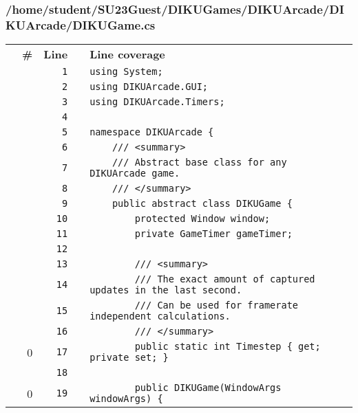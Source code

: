 \documentclass[a4paper,landscape,10pt]{article}
\begin{document}
\subsubsection{/home/student/SU23Guest/DIKUGames/DIKUArcade/DIKUArcade/DIKUGame.cs}
\begin{longtable}[l]{lrrll}
\textbf{} & \textbf{\#} & \textbf{Line} & \textbf{} & \textbf{Line coverage}\\
\cellcolor{gray} &  & \verb~1~ & & \verb~using System;~\\
\cellcolor{gray} &  & \verb~2~ & & \verb~using DIKUArcade.GUI;~\\
\cellcolor{gray} &  & \verb~3~ & & \verb~using DIKUArcade.Timers;~\\
\cellcolor{gray} &  & \verb~4~ & & \verb~~\\
\cellcolor{gray} &  & \verb~5~ & & \verb~namespace DIKUArcade {~\\
\cellcolor{gray} &  & \verb~6~ & & \verb~    /// <summary>~\\
\cellcolor{gray} &  & \verb~7~ & & \verb~    /// Abstract base class for any DIKUArcade game.~\\
\cellcolor{gray} &  & \verb~8~ & & \verb~    /// </summary>~\\
\cellcolor{gray} &  & \verb~9~ & & \verb~    public abstract class DIKUGame {~\\
\cellcolor{gray} &  & \verb~10~ & & \verb~        protected Window window;~\\
\cellcolor{gray} &  & \verb~11~ & & \verb~        private GameTimer gameTimer;~\\
\cellcolor{gray} &  & \verb~12~ & & \verb~~\\
\cellcolor{gray} &  & \verb~13~ & & \verb~        /// <summary>~\\
\cellcolor{gray} &  & \verb~14~ & & \verb~        /// The exact amount of captured updates in the last second.~\\
\cellcolor{gray} &  & \verb~15~ & & \verb~        /// Can be used for framerate independent calculations.~\\
\cellcolor{gray} &  & \verb~16~ & & \verb~        /// </summary>~\\
\cellcolor{red} & 0 & \verb~17~ & & \verb~        public static int Timestep { get; private set; }~\\
\cellcolor{gray} &  & \verb~18~ & & \verb~~\\
\cellcolor{red} & 0 & \verb~19~ & & \verb~        public DIKUGame(WindowArgs windowArgs) {~\\

\end{longtable}
\end{document}
